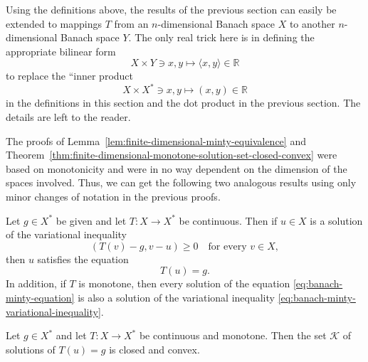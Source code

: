 \begin{Remark}
\label{rem:finite-banach-pairing-generalization}
Using the definitions above, the results of the previous section can easily be extended to mappings $T$ from an $n$-dimensional Banach space $X$ to another $n$-dimensional Banach space $Y$. The only real trick here is in defining the appropriate bilinear form
\begin{equation}\label{eq:finite-banach-spaces-appropriate-bilinear-pairing}
X\times Y\ni x,y\mapsto\langle x,y\rangle\in\mathbb{R}
\end{equation}
to replace the ``inner product\textquotesingle\textquotesingle
\begin{equation}\label{eq:banach-space-dual-inner-product-notation}
X\times X^*\ni x,y\mapsto(x,y)\in\mathbb{R}
\end{equation}
in the definitions in this section and the dot product in the previous section. The details are left to the reader.
\end{Remark}

The proofs of Lemma~\ref{lem:finite-dimensional-minty-equivalence} and Theorem~\ref{thm:finite-dimensional-monotone-solution-set-closed-convex} were based on monotonicity and were in no way dependent on the dimension of the spaces involved. Thus, we can get the following two analogous results using only minor changes of notation in the previous proofs.

\begin{Lemma}
\label{lem:banach-minty-equivalence}
Let $g\in X^*$ be given and let $T:X\to X^*$ be continuous. Then if $u\in X$ is a solution of the variational inequality
\begin{equation}\label{eq:banach-minty-variational-inequality}
(T(v)-g,v-u)\geq0\quad\text{for every }v\in X,
\end{equation}
then $u$ satisfies the equation
\begin{equation}\label{eq:banach-minty-equation}
T(u)=g.
\end{equation}
In addition, if $T$ is monotone, then every solution of the equation \eqref{eq:banach-minty-equation} is also a solution of the variational inequality \eqref{eq:banach-minty-variational-inequality}.
\end{Lemma}

\begin{Theorem}
\label{thm:banach-monotone-solution-set-closed-convex}
Let $g\in X^*$ and let $T:X\to X^*$ be continuous and monotone. Then the set $\mathcal{K}$ of solutions of $T(u)=g$ is closed and convex.
\end{Theorem}

